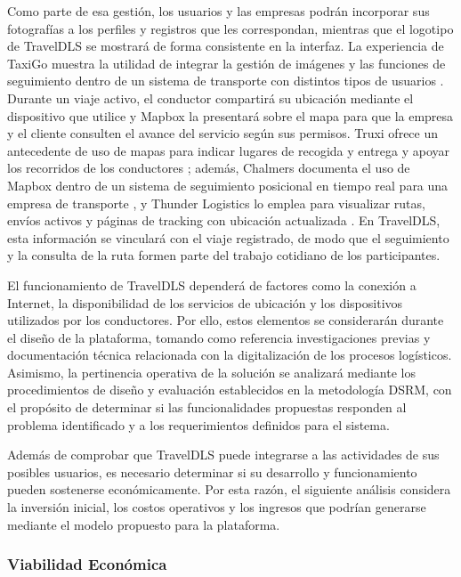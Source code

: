 Como parte de esa gestión, los usuarios y las empresas podrán incorporar sus fotografías a los perfiles y registros que les correspondan, mientras que el logotipo de TravelDLS se mostrará de forma consistente en la interfaz. La experiencia de TaxiGo muestra la utilidad de integrar la gestión de imágenes y las funciones de seguimiento dentro de un sistema de transporte con distintos tipos de usuarios \parencite{yaqoub2024taxigo}. Durante un viaje activo, el conductor compartirá su ubicación mediante el dispositivo que utilice y Mapbox la presentará sobre el mapa para que la empresa y el cliente consulten el avance del servicio según sus permisos. Truxi ofrece un antecedente de uso de mapas para indicar lugares de recogida y entrega y apoyar los recorridos de los conductores \parencite{vad2020truxi}; además, Chalmers documenta el uso de Mapbox dentro de un sistema de seguimiento posicional en tiempo real para una empresa de transporte \parencite{aronsson2021tracking}, y Thunder Logistics lo emplea para visualizar rutas, envíos activos y páginas de tracking con ubicación actualizada \parencite{deyheralde2026thunder}. En TravelDLS, esta información se vinculará con el viaje registrado, de modo que el seguimiento y la consulta de la ruta formen parte del trabajo cotidiano de los participantes.

El funcionamiento de TravelDLS dependerá de factores como la conexión a Internet, la disponibilidad de los servicios de ubicación y los dispositivos utilizados por los conductores. Por ello, estos elementos se considerarán durante el diseño de la plataforma, tomando como referencia investigaciones previas y documentación técnica relacionada con la digitalización de los procesos logísticos. Asimismo, la pertinencia operativa de la solución se analizará mediante los procedimientos de diseño y evaluación establecidos en la metodología DSRM, con el propósito de determinar si las funcionalidades propuestas responden al problema identificado y a los requerimientos definidos para el sistema.

Además de comprobar que TravelDLS puede integrarse a las actividades de sus posibles usuarios, es necesario determinar si su desarrollo y funcionamiento pueden sostenerse económicamente. Por esta razón, el siguiente análisis considera la inversión inicial, los costos operativos y los ingresos que podrían generarse mediante el modelo propuesto para la plataforma.

\subsubsection{Viabilidad Económica}
\label{sec:viabilidad-economica}

